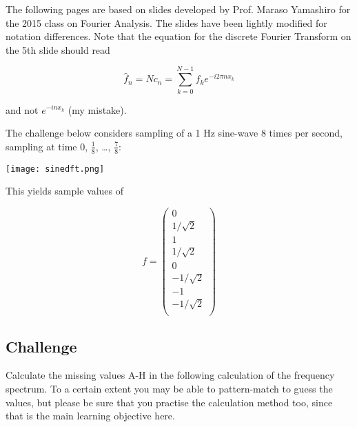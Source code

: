 The following pages are based on slides developed by Prof. Maraso Yamashiro for the 2015 class on Fourier Analysis. The slides have been lightly modified for notation differences.
Note that the equation for the discrete Fourier Transform on the 5th slide should read

\begin{equation}
    \hat{f}_n = N c_n = \sum_{k=0}^{N-1} f_k e^{-i 2 \pi n x_k}
\end{equation}

and not $e^{-inx_k}$ (my mistake).



The challenge below considers sampling of a 1 Hz sine-wave 8 times per second, sampling at time 0, $\frac{1}{8}$, \ldots, $\frac{7}{8}$:

\texttt{[image: sinedft.png]}

This yields sample values of

\begin{equation}
f = \left(
\begin{array}{c}
 0 \\
 1/\sqrt{2} \\
 1 \\
 1/\sqrt{2} \\
 0 \\
 -1/\sqrt{2} \\
 -1 \\
 -1/\sqrt{2} \\
\end{array}
\right)
\end{equation}

\subsection*{Challenge}
Calculate the missing values A-H in the following calculation of the frequency spectrum. To a certain extent you may be able to pattern-match to guess the values, but please be sure that you practise the calculation method too, since that is the main learning objective here.


